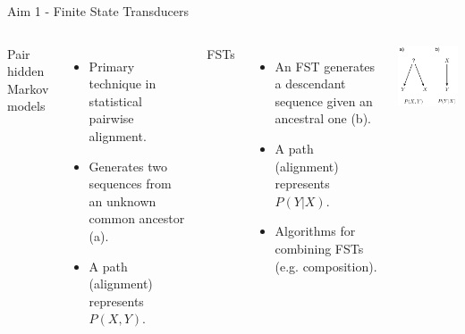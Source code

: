 \documentclass{beamer}
\begin{document}
\begin{frame}{Aim 1 - Finite State Transducers} %
\begin{columns}
Pair hidden Markov models
\begin{itemize}
	\item Primary technique in statistical pairwise alignment.
	\item Generates two sequences from an unknown common ancestor (a).
	\item A path (alignment) represents $P(X,Y)$.
\end{itemize}
\vspace{1em}
FSTs
\begin{itemize}
	\item An FST generates a descendant sequence given an ancestral one (b).
	\item A path (alignment) represents $P(Y | X)$.
	\item Algorithms for combining FSTs (e.g. composition).
\end{itemize}
\includegraphics[scale=0.9,right]{fig-fst.pdf}
\end{columns}
\end{frame} %
\end{document}
